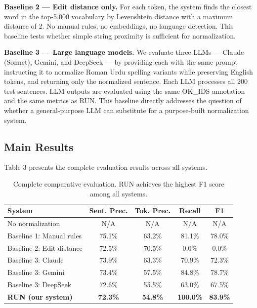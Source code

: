 \documentclass[11pt]{article}
\begin{document}
\textbf{Baseline 2 — Edit distance only.} For each token, the system finds the closest word in the top-5,000 vocabulary by Levenshtein distance with a maximum distance of 2. No manual rules, no embeddings, no language detection. This baseline tests whether simple string proximity is sufficient for normalization.

\textbf{Baseline 3 — Large language models.} We evaluate three LLMs — Claude (Sonnet), Gemini, and DeepSeek — by providing each with the same prompt instructing it to normalize Roman Urdu spelling variants while preserving English tokens, and returning only the normalized sentence. Each LLM processes all 200 test sentences. LLM outputs are evaluated using the same OK\_IDS annotation and the same metrics as RUN. This baseline directly addresses the question of whether a general-purpose LLM can substitute for a purpose-built normalization system.


\subsection{Main Results}
Table 3 presents the complete evaluation results across all systems.

\begin{table}[!ht]
\centering
\small
\begin{tabular}{lcccc}
\toprule
\textbf{System} & \textbf{Sent. Prec.} & \textbf{Tok. Prec.} & \textbf{Recall} & \textbf{F1} \\
\midrule
No normalization               & N/A   & N/A   & N/A    & N/A   \\
Baseline 1: Manual rules       & 75.1\% & 63.2\% & 81.1\% & 78.0\% \\
Baseline 2: Edit distance      & 72.5\% & 70.5\% & 0.0\%  & 0.0\%  \\
Baseline 3: Claude             & 73.9\% & 63.3\% & 70.9\% & 72.3\% \\
Baseline 3: Gemini             & 73.4\% & 57.5\% & 84.8\% & 78.7\% \\
Baseline 3: DeepSeek           & 72.6\% & 55.5\% & 63.0\% & 67.5\% \\
\textbf{RUN (our system)}      & \textbf{72.3\%} & \textbf{54.8\%} & \textbf{100.0\%} & \textbf{83.9\%} \\
\bottomrule
\end{tabular}
\caption{Complete comparative evaluation. RUN achieves the highest F1 score among all systems.}
\label{tab:main-results}
\end{table}
\end{document}
